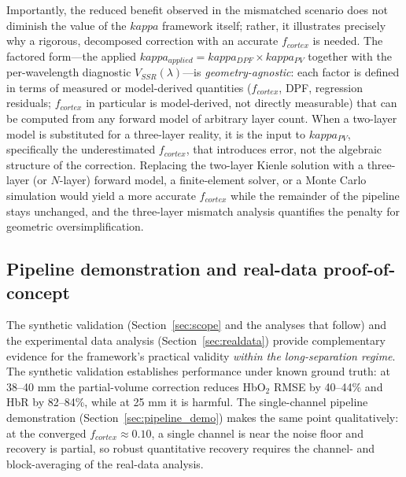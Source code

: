 \documentclass[11pt]{article}
\def\kappa{kappa}%
\def\mathrm#1{#1}%
\def\,{ }%
\begin{document}
Importantly, the reduced benefit observed in the mismatched scenario does not diminish the value of the $\kappa$ framework itself; rather, it illustrates precisely why a rigorous, decomposed correction with an accurate $f_{\mathrm{cortex}}$ is needed. The factored form---the applied $\kappa_{\mathrm{applied}} = \kappa_{\mathrm{DPF}} \times \kappa_{\mathrm{PV}}$ together with the per-wavelength diagnostic $V_{\mathrm{SSR}}(\lambda)$---is \textit{geometry-agnostic}: each factor is defined in terms of measured or model-derived quantities ($f_{\mathrm{cortex}}$, DPF, regression residuals; $f_{\mathrm{cortex}}$ in particular is model-derived, not directly measurable) that can be computed from any forward model of arbitrary layer count. When a two-layer model is substituted for a three-layer reality, it is the input to $\kappa_{\mathrm{PV}}$, specifically the underestimated $f_{\mathrm{cortex}}$, that introduces error, not the algebraic structure of the correction. Replacing the two-layer Kienle solution with a three-layer (or $N$-layer) forward model, a finite-element solver, or a Monte Carlo simulation would yield a more accurate $f_{\mathrm{cortex}}$ while the remainder of the pipeline stays unchanged, and the three-layer mismatch analysis quantifies the penalty for geometric oversimplification.

\subsection{Pipeline demonstration and real-data proof-of-concept}

The synthetic validation (Section~\ref{sec:scope} and the analyses that follow) and the experimental data analysis (Section~\ref{sec:realdata}) provide complementary evidence for the framework's practical validity \emph{within the long-separation regime}. The synthetic validation establishes performance under known ground truth: at 38--40\,mm the partial-volume correction reduces HbO$_2$ RMSE by 40--44\% and HbR by 82--84\%, while at 25\,mm it is harmful. The single-channel pipeline demonstration (Section~\ref{sec:pipeline_demo}) makes the same point qualitatively: at the converged $f_{\mathrm{cortex}}\approx0.10$, a single channel is near the noise floor and recovery is partial, so robust quantitative recovery requires the channel- and block-averaging of the real-data analysis.
\end{document}
